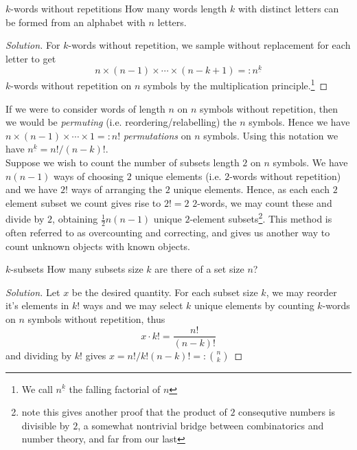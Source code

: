 \documentclass{article}
\begin{document}
\begin{problem}[]{$k$-words without repetitions}
    How many words length $k$ with distinct letters can be formed from an alphabet with $n$ letters. 
\end{problem}

\begin{proof}[Solution]
    For $k$-words without repetition, we sample without replacement for each letter to get
    \[n \times (n-1) \times \cdots \times (n-k+1) =: n^{\underline{k}}\]
    $k$-words without repetition on $n$ symbols by the multiplication principle.\footnote{
        We call $n^{\underline{k}}$ the falling factorial of $n$}
\end{proof}

If we were to consider words of length $n$ on $n$ symbols without repetition, then we would be {\it permuting} (i.e. reordering/relabelling) 
the $n$ symbols. Hence we have $n \times (n-1) \times \cdots \times 1 =: n!$ {\it permutations} on $n$ symbols. 
Using this notation we have $n^{\underline{k}} = n!/(n-k)!$. \\ 

Suppose we wish to count the number of subsets length $2$ on $n$ symbols. We have $n(n-1)$ ways of choosing 
$2$ unique elements (i.e. $2$-words without repetition) and we have $2!$ ways of arranging the $2$ unique elements. 
Hence, as each each $2$ element subset we count gives rise to $2!=2$ $2$-words, we may count these 
and divide by $2$, obtaining $\frac{1}{2}n(n-1)$ unique $2$-element subsets\footnote{note this gives another proof 
that the product of $2$ consequtive numbers is divisible by $2$, a somewhat nontrivial bridge between combinatorics 
and number theory, and far from our last}. This method is often referred to as overcounting and correcting, and 
gives us another way to count unknown objects with known objects.  

\begin{problem}[]{$k$-subsets}
    How many subsets size $k$ are there of a set size $n$?
\end{problem}

\begin{proof}[Solution]
    Let $x$ be the desired quantity. For each subset size $k$, we may reorder it's elements in $k!$ ways and we 
    may select $k$ unique elements by counting $k$-words on $n$ symbols without repetition, thus 
    \[x \cdot k! = \frac{n!}{(n-k)!}\] and dividing by $k!$ gives $x = n!/k!(n-k)! =: \binom{n}{k}$
\end{proof}
\end{document}
